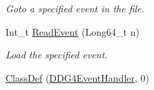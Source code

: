 \begin{DoxyCompactItemize}
\begin{DoxyCompactList}\small\item\em Goto a specified event in the file. \end{DoxyCompactList}\item 
Int\+\_\+t \hyperlink{class_d_d4hep_1_1_d_d_g4_event_handler_ad89bd74bf6a00c80055a0332a66ddee5}{Read\+Event} (Long64\+\_\+t n)
\begin{DoxyCompactList}\small\item\em Load the specified event. \end{DoxyCompactList}\item 
\hyperlink{class_d_d4hep_1_1_d_d_g4_event_handler_a0b89e00baf1f1e9a95f4f31517635e34}{Class\+Def} (\hyperlink{class_d_d4hep_1_1_d_d_g4_event_handler}{D\+D\+G4\+Event\+Handler}, 0)
\end{DoxyCompactItemize}
